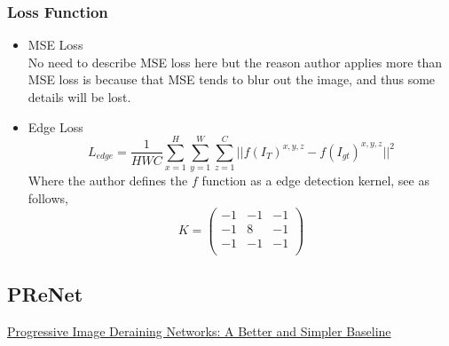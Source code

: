 \documentclass{article}
\begin{document}
\subsubsection{Loss Function}
\begin{itemize}
\item MSE Loss \bigskip \\
No need to describe MSE loss here but the reason author applies more than MSE loss is because that MSE tends to blur out the image, and thus some details will be lost.
\item Edge Loss\\ \smallskip
\begin{equation}
L_{edge}=\frac{1}{HWC} \sum_{x=1}^{H} \sum_{y=1}^{W} \sum_{z=1}^{C} \vert \vert f(I_T)^{x,y,z}-f(I_{gt})^{x,y,z} \vert \vert^2
\end{equation}
Where the author defines the $f$ function as a edge detection kernel, see as follows,
\begin{equation}
K=
\begin{pmatrix}
-1 & -1 & -1 \\
-1 &  8 & -1  \\
-1 & -1 & -1   \\
\end{pmatrix}
\end{equation}

\end{itemize}

\subsection{PReNet}
\href{https://csdwren.github.io/papers/PReNet_cvpr_camera.pdf}{Progressive Image Deraining Networks: A Better and Simpler Baseline}
\end{document}

